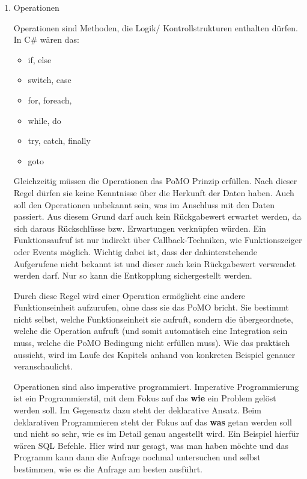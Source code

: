 \begin{enumerate}
\item Operationen




Operationen sind Methoden, die Logik/ Kontrollstrukturen enthalten dürfen. In C\# wären das:
\begin{itemize}
\item if, else
\item switch, case
\item for, foreach,
\item while, do
\item try, catch, finally
\item goto
\end{itemize}




Gleichzeitig müssen die Operationen das PoMO Prinzip erfüllen.
Nach dieser Regel dürfen sie keine Kenntnisse über die Herkunft der Daten haben. Auch soll den Operationen unbekannt sein,
was im Anschluss mit den Daten passiert. Aus diesem Grund darf auch kein Rückgabewert erwartet werden,
da sich daraus Rückschlüsse bzw. Erwartungen verknüpfen würden. 
Ein Funktionsaufruf ist nur indirekt über Callback-Techniken, wie Funktionszeiger oder Events möglich. Wichtig dabei ist, dass der dahinterstehende Aufgerufene nicht bekannt ist und dieser auch kein Rückgabewert verwendet werden darf. Nur so kann die Entkopplung sichergestellt werden.

Durch diese Regel wird einer Operation ermöglicht eine andere Funktionseinheit
aufzurufen, ohne dass sie das PoMO bricht. Sie bestimmt nicht selbst, welche
Funktionseinheit sie aufruft, sondern die übergeordnete, welche die Operation
aufruft (und somit automatisch eine Integration sein muss, welche die PoMO Bedingung nicht erfüllen muss).
Wie das praktisch aussieht, wird im Laufe des Kapitels anhand von konkreten
Beispiel genauer veranschaulicht.

Operationen sind also imperative programmiert. Imperative Programmierung ist ein Programmierstil,
mit dem Fokus auf das \textbf{wie} ein Problem gelöst werden soll.
Im Gegensatz dazu steht der deklarative Ansatz.
Beim deklarativen Programmieren steht der Fokus auf das \textbf{was} getan werden soll und nicht so sehr,
wie es im Detail genau angestellt wird. Ein Beispiel hierfür wären SQL Befehle.
Hier wird nur gesagt, was man haben möchte und das Programm kann dann die Anfrage nochmal untersuchen
und selbst bestimmen, wie es die Anfrage am besten ausführt.


\end{enumerate}
